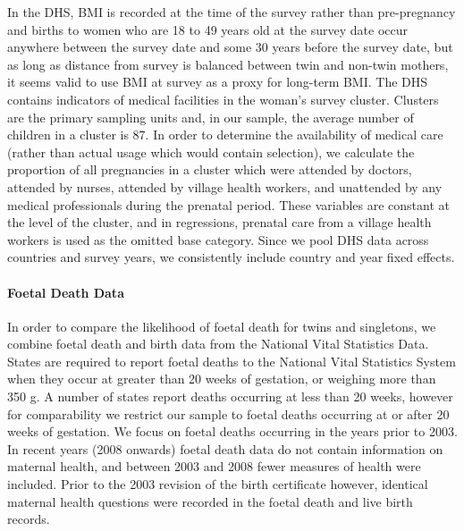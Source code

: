 \documentclass[12pt]{article}
\begin{document}
In the DHS, BMI is recorded at the time of the survey rather than pre-pregnancy and births to women who are 18 to 49 years old at the survey date occur anywhere between the survey date and some 30 years before the survey date, but as long as distance from survey is balanced between twin and non-twin mothers, it seems valid to use BMI at survey as a proxy for long-term BMI. The DHS contains indicators of medical facilities in the woman's survey cluster. Clusters  are the primary sampling units and, in our sample, the average number of children in a cluster is 87. In order to determine the availability of medical care (rather than actual usage which would contain selection), we calculate the proportion of all pregnancies in a cluster which were attended by doctors, attended by nurses, attended by village health workers, and unattended by any medical professionals during the prenatal period. These variables are constant at the level of the cluster, and in regressions, prenatal care from a village health workers is used as the omitted base category. Since we pool DHS data across countries and survey years, we consistently include country and year fixed effects. %

\paragraph{Foetal Death Data}
In order to compare the likelihood of foetal death for twins and singletons, we combine foetal death and birth data from the National Vital Statistics Data. States are required to report foetal deaths to the National Vital Statistics System when they occur at greater than 20 weeks of gestation, or weighing more than 350 g. A number of states report deaths occurring at less than 20 weeks, however for comparability we restrict our sample to foetal deaths occurring at or after 20 weeks of gestation.  We focus on foetal deaths occurring in the years prior to 2003.  In recent years (2008 onwards) foetal death data do not contain information on maternal health, and between 2003 and 2008 fewer measures of health were included.  Prior to the 2003 revision of the birth certificate however, identical maternal health questions were recorded in the foetal death and live birth records.
\end{document}
